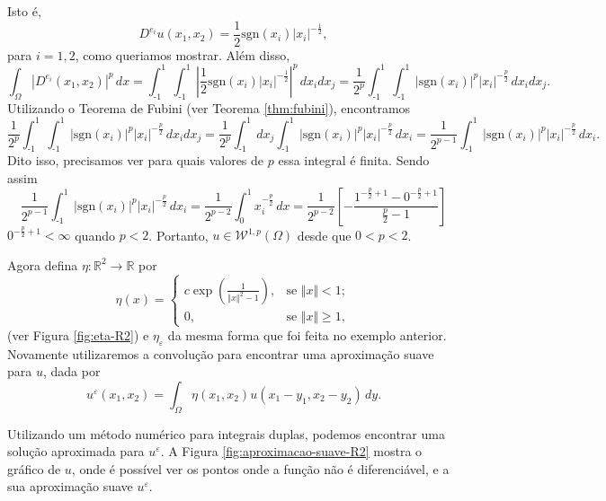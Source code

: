 \documentclass[a4paper, 11pt]{book}
\theoremstyle{definition}
\newcommand{\bR}{\mathbb{R}}
\newcommand{\cW}{\mathcal{W}}
\newcommand{\sgn}{\mathrm{sgn}}
\begin{document}
\begin{ex}
\[    \]
    Isto é,
    \[
        D^{e_i} u(x_1,x_2) = \frac{1}{2}\sgn(x_i) |x_i|^{-\frac{1}{2}},
    \]
    para $i = 1,2$, como queriamos mostrar.
    Além disso,
    \[
        \int_\Omega |D^{e_i} (x_1,x_2)|^p \, dx = \int_{\text{-}1}^1 \int_{\text{-}1}^1 \left| \frac{1}{2} \sgn(x_i) |x_i|^{-\frac{1}{2}} \right|^p \, dx_i dx_j = \frac{1}{2^p}\int_{\text{-}1}^1 \int_{\text{-}1}^1 |\sgn(x_i)|^p |x_i|^{-\frac{p}{2}} \,dx_i dx_j.
    \]
    Utilizando o Teorema de Fubini (ver Teorema \ref{thm:fubini}), encontramos
    {\small
    \[
        \frac{1}{2^p}\int_{\text{-}1}^1\int_{\text{-}1}^1 |\sgn(x_i)|^p |x_i|^{-\frac{p}{2}} \,dx_i dx_j = \frac{1}{2^p}\int_{\text{-}1}^1 dx_j \int_{\text{-}1}^1 |\sgn(x_i)|^p |x_i|^{-\frac{p}{2}} \,dx_i = \frac{1}{2^{p-1}} \int_{\text{-}1}^1 |\sgn(x_i)|^p |x_i|^{-\frac{p}{2}} \,dx_i.
    \]}\!
    Dito isso, precisamos ver para quais valores de $p$ essa integral é finita. Sendo assim
    \[
        \frac{1}{2^{p-1}} \int_{\text{-}1}^1 |\sgn(x_i)|^p |x_i|^{-\frac{p}{2}} \,dx_i = \frac{1}{2^{p-2}}\int_0^1 x_i^{-\frac{p}{2}} \,dx = \frac{1}{2^{p-2}} \left[ -\frac{1^{-\frac{p}{2}+1} - 0^{-\frac{p}{2}+1}}{\tfrac{p}{2} - 1} \right]
    \]
    $0^{-\frac{p}{2} + 1} < \infty$ quando $p < 2$. Portanto, $u \in \cW^{1,p}(\Omega)$ desde que $0 < p < 2$.

    Agora defina $\eta: \bR^2 \to \bR$ por
    \[
        \eta(x) = 
        \left\{ 
            \begin{array}{lr}
                c \exp\left(\frac{1}{\Vert x \Vert^2 - 1} \right), & \text{se } \Vert x \Vert < 1;\\
                0, & \text{se } \Vert x \Vert \geqslant 1,
            \end{array}
        \right.
    \]
    (ver Figura \ref{fig:eta-R2}) e $\eta_\varepsilon$ da mesma forma que foi feita no exemplo anterior. Novamente utilizaremos a convolução para encontrar uma aproximação suave para $u$, dada por
    \[
        u^{\varepsilon}(x_1,x_2) = \int_\Omega \eta(x_1,x_2) u(x_1 - y_1, x_2 - y_2) \,dy.
    \]

    Utilizando um método numérico para integrais duplas, podemos encontrar uma solução aproximada para $u^\varepsilon$.
    A Figura \ref{fig:aproximacao-suave-R2} mostra o gráfico de $u$, onde é possível ver os pontos onde a função não é diferenciável, e a sua aproximação suave $u^\varepsilon$.


\end{ex}
\end{document}
